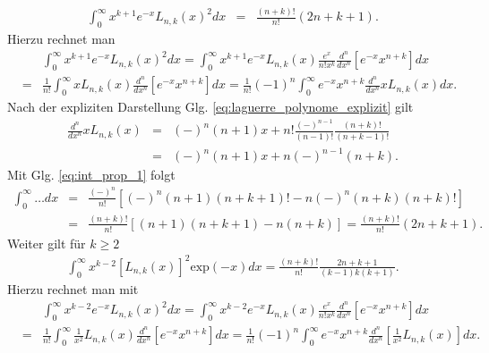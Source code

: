 \documentclass{book}
\renewcommand{\exp}{\text{exp}}
\begin{document}
%
\begin{eqnarray}
\int_{0}^{\infty}x^{k + 1}e^{-x}L_{n, k}\left(x\right)^2dx & = & \frac{\left(n + k\right)!}{n!}\left(2n + k + 1\right)\label{eq:laguerre_integral}.
\end{eqnarray}
%
Hierzu rechnet man
%
\begin{eqnarray}
&&\int_{0}^{\infty}x^{k + 1}e^{-x}L_{n, k}\left(x\right)^2dx = \int_{0}^{\infty}x^{k + 1}e^{-x}L_{n, k}\left(x\right)\frac{e^x}{n!x^k}\frac{d^n}{dx^n}\left[e^{-x}x^{n + k}\right]dx\nonumber\\
& = & \frac{1}{n!}\int_{0}^{\infty}xL_{n, k}\left(x\right)\frac{d^n}{dx^n}\left[e^{-x}x^{n + k}\right]dx = \frac{1}{n!}\left(-1\right)^n\int_{0}^{\infty}e^{-x}x^{n + k}\frac{d^n}{dx^n}xL_{n, k}\left(x\right)dx.
\end{eqnarray}
%
Nach der expliziten Darstellung Glg. \eqref{eq:laguerre_polynome_explizit} gilt
%
\begin{eqnarray}
\frac{d^n}{dx^n}xL_{n, k}\left(x\right) & = & \left(-\right)^n\left(n + 1\right)x + n!\frac{\left(-\right)^{n - 1}}{\left(n - 1\right)!}\frac{\left(n + k\right)!}{\left(n + k - 1\right)!}\nonumber\\
& = & \left(-\right)^n\left(n + 1\right)x + n\left(-\right)^{n - 1}\left(n + k\right).
\end{eqnarray}
%
Mit Glg. \eqref{eq:int_prop_1} folgt
%
\begin{eqnarray}
\int_0^\infty\dotsc dx & = & \frac{\left(-\right)^n}{n!}\left[\left(-\right)^n\left(n + 1\right)\left(n + k + 1\right)! - n\left(-\right)^n\left(n + k\right)\left(n + k\right)!\right]\nonumber\\
& = & \frac{\left(n + k\right)!}{n!}\left[\left(n + 1\right)\left(n + k + 1\right) - n\left(n + k\right)\right] = \frac{\left(n + k\right)!}{n!}\left(2n + k + 1\right).
\end{eqnarray}
%
Weiter gilt für $k\geq2$
%
\begin{eqnarray}
\int_{0}^{\infty}x^{k - 2}\left[L_{n, k}\left(x\right)\right]^2\exp\left(-x\right)dx = \frac{\left(n + k\right)!}{n!}\frac{2n + k + 1}{\left(k - 1\right)k\left(k + 1\right)}\label{eq:laguerre_int_prop_2}.
\end{eqnarray}
%
Hierzu rechnet man mit
%
\begin{eqnarray}
&&\int_{0}^{\infty}x^{k - 2}e^{-x}L_{n, k}\left(x\right)^2dx = \int_{0}^{\infty}x^{k - 2}e^{-x}L_{n, k}\left(x\right)\frac{e^x}{n!x^k}\frac{d^n}{dx^n}\left[e^{-x}x^{n + k}\right]dx\nonumber\\
& = & \frac{1}{n!}\int_{0}^{\infty}\frac{1}{x^2}L_{n, k}\left(x\right)\frac{d^n}{dx^n}\left[e^{-x}x^{n + k}\right]dx = \frac{1}{n!}\left(-1\right)^n\int_{0}^{\infty}e^{-x}x^{n + k}\frac{d^n}{dx^n}\left[\frac{1}{x^2}L_{n, k}\left(x\right)\right]dx.
\end{eqnarray}
\end{document}
